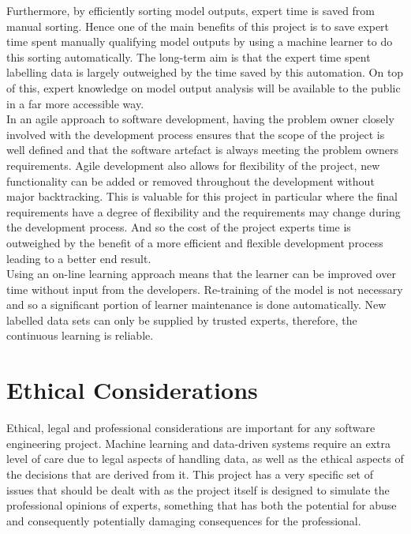 \documentclass{ecmm427_assignment}
\begin{document}
\quad Furthermore, by efficiently sorting model outputs, expert time is saved from manual sorting. Hence one of the main benefits of this project is to save expert time spent manually qualifying model outputs by using a machine learner to do this sorting automatically. The long-term aim is that the expert time spent labelling data is largely outweighed by the time saved by this automation. On top of this, expert knowledge on model output analysis will be available to the public in a far more accessible way.\\

\quad In an agile approach to software development, having the problem owner closely involved with the development process ensures that the scope of the project is well defined and that the software artefact is always meeting the problem owners requirements. Agile development also allows for flexibility of the project, new functionality can be added or removed throughout the development without major backtracking. This is valuable for this project in particular where the final requirements have a degree of flexibility and the requirements may change during the development process. And so the cost of the project experts time is outweighed by the benefit of a more efficient and flexible development process leading to a better end result.\\

\quad Using an on-line learning approach means that the learner can be improved over time without input from the developers. Re-training of the model is not necessary and so a significant portion of learner maintenance is done automatically. New labelled data sets can only be supplied by trusted experts, therefore, the continuous learning is reliable.\\

\section{Ethical Considerations}

\quad Ethical, legal and professional considerations are important for any
software engineering project. Machine learning and data-driven systems
require an extra level of care due to legal aspects of handling data,
as well as the ethical aspects of the decisions that are derived from
it. This project has a very specific set of issues that should be
dealt with as the project itself is designed to simulate the professional
opinions of experts, something that has both the potential for abuse
and consequently potentially damaging consequences for the professional.
\end{document}

